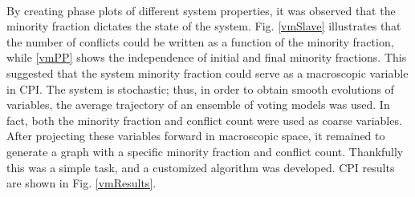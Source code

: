 \documentclass[11pt]{article}
\begin{document}
\\
\indent By creating phase plots of different system properties, it was observed that the minority fraction dictates the state of the system. Fig. \ref{vmSlave} illustrates that the number of conflicts could be written as a function of the minority fraction, while \ref{vmPP} shows the independence of initial and final minority fractions. This suggested that the system minority fraction could serve as a macroscopic variable in CPI. The system is stochastic; thus,  in order to obtain smooth evolutions of variables, the average trajectory of an ensemble of voting models was used. In fact, both the minority fraction and conflict count were used as coarse variables. After projecting these variables forward in macroscopic space, it remained to generate a graph with a specific minority fraction and conflict count. Thankfully this was a simple task, and a customized algorithm was developed. CPI results are shown in Fig. \ref{vmResults}.\\
\end{document}
